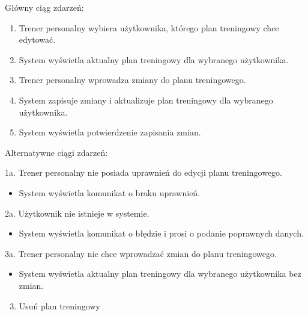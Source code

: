 \documentclass[
]{article}
\providecommand{\tightlist}{%
  \setlength{\itemsep}{0pt}\setlength{\parskip}{0pt}}
\begin{document}
{Główny ciąg zdarzeń:}

\begin{enumerate}
\tightlist
\item
  {Trener personalny wybiera użytkownika, którego plan treningowy chce
  edytować.}
\item
  {System wyświetla aktualny plan treningowy dla wybranego użytkownika.}
\item
  {Trener personalny wprowadza zmiany do planu treningowego.}
\item
  {System zapisuje zmiany i aktualizuje plan treningowy dla wybranego
  użytkownika.}
\item
  {System wyświetla potwierdzenie zapisania zmian.}
\end{enumerate}

{Alternatywne ciągi zdarzeń:}

{1a. Trener personalny nie posiada uprawnień do edycji planu
treningowego.}

\begin{itemize}
\tightlist
\item
  {System wyświetla komunikat o braku uprawnień.}
\end{itemize}

{2a. Użytkownik nie istnieje w systemie.}

\begin{itemize}
\tightlist
\item
  {System wyświetla komunikat o błędzie i prosi o podanie poprawnych
  danych.}
\end{itemize}

{3a. Trener personalny nie chce wprowadzać zmian do planu treningowego.}

\begin{itemize}
\tightlist
\item
  {System wyświetla aktualny plan treningowy dla wybranego użytkownika
  bez zmian.}
\end{itemize}

{}

\begin{enumerate}
\setcounter{enumi}{2}
\tightlist
\item
  {Usuń plan treningowy}
\end{enumerate}
\end{document}
